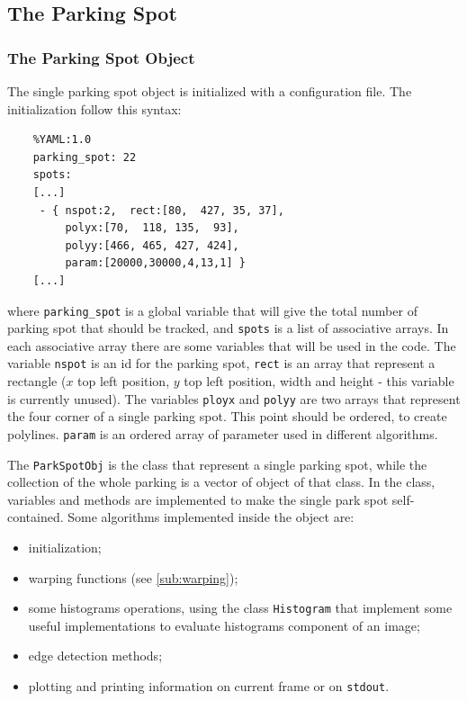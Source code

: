 	\subsection{The Parking Spot}
	
		\subsubsection{The Parking Spot Object}
		
			The single parking spot object is initialized with a configuration file. The
			initialization follow this syntax:
			\begin{verbatim}
	%YAML:1.0
	parking_spot: 22
	spots: 
	[...]
	 - { nspot:2,  rect:[80,  427, 35, 37], 
	     polyx:[70,  118, 135,  93], 
	     polyy:[466, 465, 427, 424], 
	     param:[20000,30000,4,13,1] }
	[...]		
			\end{verbatim}
			where \verb+parking_spot+ is a global variable that will give the total number
			of parking spot that should be tracked, and \verb+spots+ is a list of
			associative arrays. In each associative array there are some variables that
			will be used in the code. The variable \verb+nspot+ is an id for the parking
			spot, \verb+rect+ is an array that represent a rectangle ($x$ top left
			position, $y$ top left position, width and height - this variable is
			currently unused). The variables \verb+ployx+ and \verb+polyy+ are two arrays
			that represent the four corner of a single parking spot. This point should be
			ordered, to create polylines. \verb+param+ is an ordered array of parameter
			used in different algorithms. 
			
			The \verb+ParkSpotObj+ is the class that represent a single parking spot,
			while the collection of the whole parking is a vector of object of that class.
			In the class, variables and methods are implemented to make the single park
			spot self-contained. Some algorithms implemented inside the object are:
			\begin{itemize}
			  \item initialization;
			  \item warping functions (see \ref{sub:warping});
			  \item some histograms operations, using the class \verb+Histogram+ that
			  implement some useful implementations to evaluate histograms component of
			  an image;
			  \item edge detection methods;
			  \item plotting and printing information on current frame or on
			  \verb+stdout+.
			\end{itemize}
		
